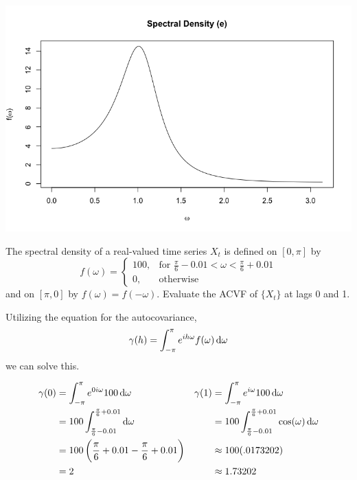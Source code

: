 \documentclass[10pt,a4paper]{exam}
\begin{document}
\begin{questions}
\begin{parts}
\begin{solution}
\begin{center}
\includegraphics[width = .9\linewidth]{1e}
\end{center}
\end{solution}
\end{parts}

\pagebreak
\question The spectral density of a real-valued time series $X_t$ is defined on $[0,\pi]$ by
\[
	f(\omega) = \begin{cases}
		100,		& \text{for }\frac{\pi}{6}-0.01 < \omega < 
									\frac{\pi}{6} + 0.01\\
		0,	& \text{otherwise} \end{cases}
\]
and on $[\pi, 0]$ by $f(\omega) = f(-\omega)$. Evaluate the ACVF of $\{X_t\}$ at lags 0 and 1.
\end{questions}

\begin{solution}
Utilizing the equation for the autocovariance,
$$\gamma(h) = \int_{-\pi}^{\pi} e^{ih\omega}f(\omega) \dif \omega$$
we can solve this.

\begin{align*}
\gamma(0)			&= \int_{-\pi}^\pi e^{0i\omega} 100 \dif \omega			& \gamma(1)	&= \int_{-\pi}^\pi e^{i\omega} 100 \dif \omega\\
							&= 100\int_{\frac{\pi}{6}-0.01}^{\frac{\pi}{6}+0.01}\dif \omega 	& &= 100\int_{\frac{\pi}{6}-0.01}^{\frac{\pi}{6}+0.01} \cos(\omega) \dif \omega \\
							&= 100 \left(\frac{\pi}{6} + 0.01 - \frac{\pi}{6} + 0.01\right)			& &\approx 100(.0173202)\\
							&= 2				& &\approx 1.73202
\end{align*}
\end{solution}
\end{document}
